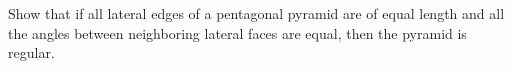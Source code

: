 Show that if all lateral edges of a pentagonal pyramid are of equal length and all the angles between neighboring lateral faces are equal, then the pyramid is regular.